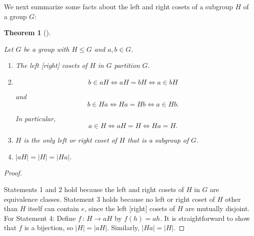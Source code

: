 \documentclass[10pt,]{book}
\theoremstyle{plain}
\newtheorem{theorem}{Theorem}[section]
\theoremstyle{definition}
\theoremstyle{definition}
\theoremstyle{definition}
\theoremstyle{definition}
\numberwithin{equation}{section}
\begin{document}
    We next summarize some facts about the left and right cosets of
    a subgroup \(H\) of a group \(G\):
\begin{theorem}[{}]\label{cosetfacts}

        Let \(G\) be a group with \(H\leq G\) and \(a,b\in G\).
        \leavevmode%
\begin{enumerate}
\item\hypertarget{li-408}{}
              The left [right] cosets of \(H\) in \(G\) partition \(G\).
\item\hypertarget{li-409}{}
\begin{equation*}

                b\in aH \Leftrightarrow aH=bH \Leftrightarrow  a\in bH
              
\end{equation*}

              and
\begin{equation*}

                b\in Ha \Leftrightarrow  Ha=Hb \Leftrightarrow  a\in
                Hb.
              
\end{equation*}

              In particular, %
\begin{equation*}
a\in H \Leftrightarrow aH=H \Leftrightarrow Ha=H.
\end{equation*}

\item\hypertarget{li-410}{}
              \(H\) is the only left or right coset of \(H\) that is a \emph{subgroup}
              of \(G\).
\item\hypertarget{li-411}{}
              \(|aH|=|H|=|Ha|\).
\end{enumerate}

\end{theorem}
\begin{proof}\hypertarget{proof-39}{}

      Statements 1 and 2 hold because the left and right
      cosets of \(H\) in \(G\) are equivalence classes. Statement 3
      holds because no left or right coset of \(H\) other than \(H\)
      itself can contain \(e\), since the left [right] cosets of \(H\)
      are mutually disjoint. For Statement 4: Define \(f\,:\,H\to aH\) by \(f(h)=ah\). It is straightforward to show that \(f\) is a bijection, so \(|H|=|aH|\). Similarly, \(|Ha|=|H|\).
\end{proof}
\end{document}
